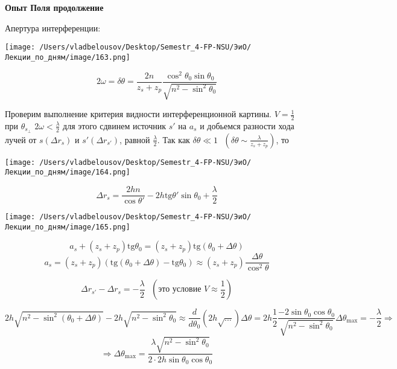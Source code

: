 \documentclass[12pt, a4paper]{report}
\begin{document}
\fi


\textbf{Опыт Поля продолжение}

Апертура интерференции: 

\begin{center}
    \texttt{[image: /Users/vladbelousov/Desktop/Semestr\_4-FP-NSU/ЭиО/Лекции\_по\_дням/image/163.png]}
\end{center}

\[ 2 \omega = \delta \theta = \frac{2n}{z_s + z_p } \frac{ \cos  ^2 \theta_0 \sin  \theta_0 }{\sqrt{n ^2 - \sin  ^2 \theta_0}}   \] 

Проверим выполнение критерия видности интерференционной картины. \( V = \displaystyle  \frac{1}{2 }   \)  при \( \theta_{s _\perp }   \)  \( 2 \omega< \displaystyle  \frac{\lambda}{2 }   \) для этого сдвинем источник \( s ' \) на \( a_s  \) и добьемся разности хода лучей от \( s (\Delta r_s ) \)  и \( s ' (\Delta r _{s '} ) \), равной \( \displaystyle  \frac{\lambda}{2 }  \). Так как \( \delta \theta \ll 1 \text{ }  \left(  \displaystyle  \delta \theta \sim  \frac{\lambda}{z_s + z_p}  \right) \), то 

\begin{center}
    \texttt{[image: /Users/vladbelousov/Desktop/Semestr\_4-FP-NSU/ЭиО/Лекции\_по\_дням/image/164.png]}
\end{center}

\[ \Delta r_s = \frac{2 h n }{\cos  \theta ' } - 2h \mathrm{tg } \theta ' \sin  \theta_0 + \frac{\lambda}{2 }    \] 

\begin{center}
    \texttt{[image: /Users/vladbelousov/Desktop/Semestr\_4-FP-NSU/ЭиО/Лекции\_по\_дням/image/165.png]}
\end{center}

\[ a_s + (z_s + z_p ) \mathrm{ tg }  \theta_0 = (z_s + z_p ) \mathrm{tg }  (\theta_0 + \Delta \theta )   \] 
\[ a_s = (z_s + z_p ) ( \mathrm{ tg }  ( \theta_0 + \Delta \theta  ) - \mathrm{ tg }  \theta_0  ) \approx (z_s + z_p ) \frac{\Delta \theta }{\cos  ^2 \theta}  \] 

\[ \Delta r_{s ' }  - \Delta r_s = - \frac{\lambda}{2 }  \text{ }  \left( \text{это условие } V \approx \frac{1}{2}  \right) \] 

\[ 2h \sqrt{n ^2 - \sin  ^2 (\theta_0 + \Delta \theta  )} - 2h \sqrt{n ^2 - \sin  ^2 \theta_0 } \approx \frac{d}{d \theta_0 } (2h \sqrt{... })  \Delta \theta = 2h \frac{1}{2 }  \frac{ - 2 \sin  \theta_0 \cos  \theta_0 }{\sqrt{n ^2 - \sin  ^2 \theta_0 }} \Delta \theta_{ \max  } = - \frac{\lambda}{2} \Rightarrow    \] 
\[ \Rightarrow \Delta \theta_{ \max  } = \frac{ \lambda \sqrt{ n ^2 - \sin  ^2 \theta_0 }}{ 2 \cdot 2 h \sin  \theta_0 \cos  \theta_0}    \] 
\end{document}
